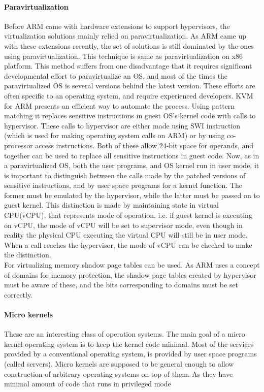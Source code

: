 \documentclass[a4paper,10pt]{article}
\begin{document}
  
  
  \paragraph{Paravirtualization}
  
  Before ARM came with hardware extensions to support hypervisors, the virtualization solutions mainly relied on paravirtualization. As ARM came up with these 
  extensions recently, the set of solutions is still dominated by the ones using paravirtualization. This technique is same as paravirtualization
  on x86 platform. This method suffers from one disadvantage that it requires significant developmental effort to paravirtualize an OS, and most of the times the
  paravirtualized OS is several versions behind the latest version. These efforts are often specific to an operating system, and require experienced developers.
  KVM for ARM \cite{KVM-for-ARM} presents an efficient way to automate the process. Using pattern matching it replaces sensitive instructions in guest OS's kernel
  code with calls to hypervisor. These calls to hypervisor are either made using SWI instruction (which is used for making operating system calls on ARM) or by using co-processor
  access instructions. Both of these allow 24-bit space for operands, and together can be used to replace all sensitive instructions in guest code.
  Now, as in a paravirtualized OS, both the user programs, and OS kernel run in user mode, it is important to distinguish between the calls made by the patched versions of
  sensitive instructions, and by user space programs for a kernel function. The former must be emulated by the hypervisor, while the latter must be passed on to
  guest kernel. This distinction is made by maintaining state in virtual CPU(vCPU), that represents mode of operation, i.e. if guest kernel is executing on vCPU, the mode
  of vCPU will be set to supervisor mode, even though in reality the physical CPU executing the virtual CPU will still be in user mode. When a call reaches the
  hypervisor, the mode of vCPU can be checked to make the distinction.
  \\
  For virtualizing memory shadow page tables can be used. As ARM uses a concept of domains for memory protection, the shadow page tables created by hypervisor must be aware
  of these, and the bits corresponding to domains must be set correctly.
  
  \paragraph{Micro kernels}
  These are an interesting class of operation systems. The main goal of a micro kernel operating system is to keep the kernel code minimal. Most of the services provided by
  a conventional operating system, is provided by user space programs (called servers). Micro kernels are supposed to be general enough to allow construction of
  arbitrary operating systems on top of them. As they have minimal amount of code that runs in privileged mode
\end{document}

